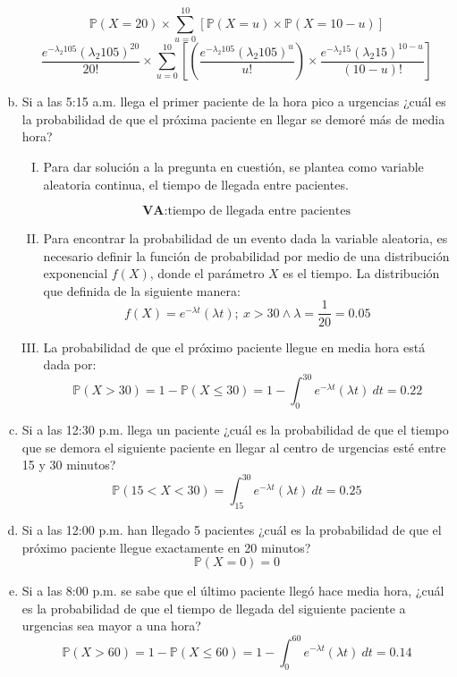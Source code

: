 \documentclass[11pt, spanish]{article}
\begin{document}
\begin{enumerate}[(a)]
$$\mathbb{P}(X = 20) \times  \sum_{u = 0}^{10} \left[  \mathbb{P}(X = u) \times \mathbb{P}(X = 10 - u)\right] $$
$$\frac{e^{-\lambda_{2} 105}(\lambda_{2} 105)^{20}}{20!} \times \sum_{u = 0}^{10} \left[ \left( \frac{e^{-\lambda_{2} 105}(\lambda_{2} 105)^{u}}{u!}\right) \times \frac{e^{-\lambda_{2} 15}(\lambda_{2} 15)^{10-u}}{(10-u)!} \right]$$

\item Si a las 5:15 a.m. llega el primer paciente de la hora pico a urgencias ¿cuál es la
probabilidad de que el próxima paciente en llegar se demoré más de media hora?\\

\begin{enumerate}[(I)]

\item Para dar solución a la pregunta en cuestión, se plantea como variable aleatoria
continua, el tiempo de llegada entre pacientes.

$$\textbf{VA}: \mbox{tiempo de llegada entre pacientes}$$

\item Para encontrar la probabilidad de un evento dada la variable aleatoria, es
necesario definir la función de probabilidad por medio de una distribución
exponencial $f(X)$, donde el parámetro $X$ es el tiempo. La distribución que
definida de la siguiente manera:
$$f(X) = e^{-\lambda t}(\lambda t);\ x > 30 \wedge \lambda = \frac{1}{20} = 0.05$$

\item La probabilidad de que el próximo paciente llegue en media hora está dada
por:
$$\mathbb{P}(X > 30) = 1 - \mathbb{P}(X \leq 30) = 1 - \int_{0}^{30} e^{-\lambda t}(\lambda t)\ dt = 0.22$$

\end{enumerate}

\item Si a las 12:30 p.m. llega un paciente ¿cuál es la probabilidad de que el tiempo que
se demora el siguiente paciente en llegar al centro de urgencias esté entre 15 y 30 minutos?
$$\mathbb{P}(15 < X < 30) = \int_{15}^{30} e^{-\lambda t}(\lambda t)\ dt = 0.25$$

\item Si a las 12:00 p.m. han llegado 5 pacientes ¿cuál es la probabilidad de que el
próximo paciente llegue exactamente en 20 minutos?
$$\mathbb{P}(X = 0) = 0$$

\item Si a las 8:00 p.m. se sabe que el último paciente llegó hace media hora, ¿cuál es
la probabilidad de que el tiempo de llegada del siguiente paciente a urgencias sea mayor a
una hora?
$$\mathbb{P}(X > 60) = 1 - \mathbb{P}(X \leq  60) = 1 - \int_{0}^{60} e^{-\lambda t}(\lambda t)\ dt = 0.14$$

\end{enumerate}
\end{document}

